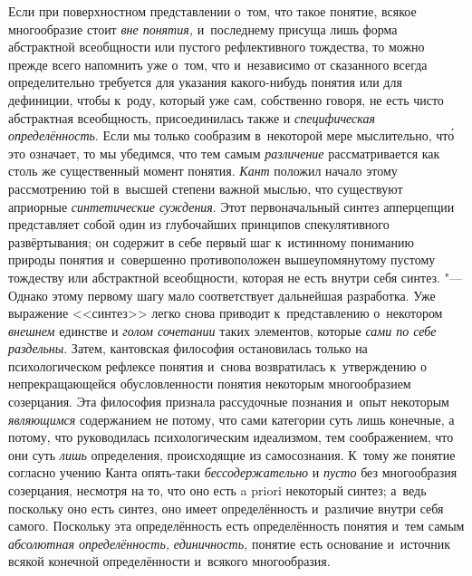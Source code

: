 Если при поверхностном представлении о~том, что такое понятие,
всякое многообразие стоит {\em вне
понятия,} и~последнему присуща лишь форма абстрактной
всеобщности или пустого рефлективного тождества, то можно прежде всего
напомнить уже о~том, что и~независимо от сказанного всегда определительно
требуется для указания какого-нибудь понятия или для
дефиниции, чтобы к~роду, который уже сам, собственно говоря, не есть чисто
абстрактная всеобщность, присоединилась также и
{\em специфическая определённость}.
Если мы только сообразим в~некоторой мере мыслительно, чт\'{о}
это означает, то мы убедимся, что тем самым
{\em различение}
рассматривается как столь же существенный момент понятия.
{\em Кант} положил начало
этому рассмотрению той в~высшей степени важной мыслью, что существуют
априорные {\em синтетические суждения}.
Этот первоначальный синтез апперцепции представляет собой
один из глубочайших принципов спекулятивного развёртывания; он содержит в
себе первый шаг к~истинному пониманию природы понятия и~совершенно
противоположен вышеупомянутому пустому тождеству или абстрактной
всеобщности, которая не есть внутри себя синтез. "--- Однако
этому первому шагу мало соответствует дальнейшая разработка. Уже выражение
<<синтез>> легко снова приводит к~представлению о~некотором
{\em внешнем} единстве и {\em голом сочетании} таких элементов, которые
{\em сами по себе раздельны}.
Затем, кантовская философия остановилась только на
психологическом рефлексе понятия и~снова возвратилась к~утверждению о
непрекращающейся обусловленности понятия некоторым многообразием
созерцания. Эта философия признала рассудочные познания и~опыт некоторым
{\em являющимся}
содержанием не потому, что сами категории суть лишь конечные,
а потому, что руководилась психологическим идеализмом, тем соображением,
что они суть {\em лишь}
определения, происходящие из самосознания. К~тому же понятие
согласно учению Канта опять-таки
{\em бессодержательно} и
{\em пусто} без
многообразия созерцания, несмотря на то, что оно есть a priori
некоторый синтез; а~ведь поскольку оно есть синтез, оно имеет
определённость и~различие внутри себя самого. Поскольку эта определённость
есть определённость понятия и~тем самым
{\em абсолютная определённость,}
{\em единичность,} понятие
есть основание и~источник всякой конечной определённости и~всякого
многообразия.

